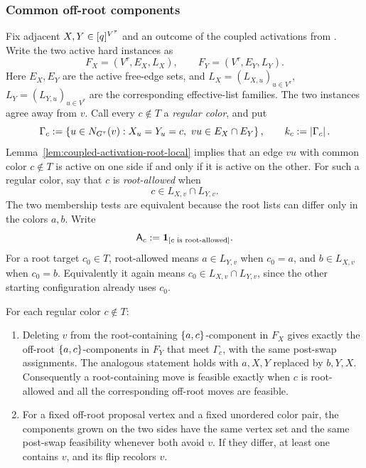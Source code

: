 \subsubsection{Common off-root components}
Fix adjacent \(X,Y\in[q]^{V^\tau}\) and an outcome of the coupled activations from
.  Write the two active hard
instances as
\[
  F_X=(V^\tau,E_X,L_X),\qquad F_Y=(V^\tau,E_Y,L_Y).
\]
Here \(E_X,E_Y\) are the active free-edge sets, and
\(L_X=(L_{X,u})_{u\in V^\tau}\), \(L_Y=(L_{Y,u})_{u\in V^\tau}\)
are the corresponding effective-list families.  The two instances agree
away from $v$.  Call every \(c\notin T\) a
\emph{regular color}, and put
\[
  \Gamma_c:=\left\{u\in N_{G^\tau}(v):
      X_u=Y_u=c,\ vu\in E_X\cap E_Y\right\},\qquad k_c:=\left|\Gamma_c\right|.
\]
Lemma~\ref{lem:coupled-activation-root-local} implies that an edge $vu$ with common color
$c\notin T$ is active on one side if and only if it is active on the other.
For such a regular color, say that \(c\) is \emph{root-allowed} when
\[
  c\in L_{X,v}\cap L_{Y,v}.
\]
The two membership tests are equivalent because the root lists can differ
only in the colors \(a,b\).  Write
\[
  \mathsf A_c:=\mathbf{1}_{\left[c\text{ is root-allowed}\right]}.
\]
For a root target \(c_0\in T\), root-allowed
means \(a\in L_{Y,v}\) when \(c_0=a\), and \(b\in L_{X,v}\) when \(c_0=b\).
Equivalently it again means \(c_0\in L_{X,v}\cap L_{Y,v}\), since the other
starting configuration already uses \(c_0\).

\begin{lemma}\label{lem:cv-root-local-structure}
For each regular color $c\notin T$:
\begin{enumerate}
\item Deleting $v$ from the root-containing $\left\{a,c\right\}$-component in
  $F_X$ gives exactly the off-root $\left\{a,c\right\}$-components in $F_Y$ that
  meet $\Gamma_c$, with the same post-swap assignments.  The analogous
  statement holds with $a,X,Y$ replaced by $b,Y,X$.  Consequently a
  root-containing move is feasible exactly when $c$ is root-allowed
  and all the corresponding off-root moves are feasible.
\item For a fixed off-root proposal vertex and a fixed unordered color
  pair, the components grown on the two sides have the same vertex set and
  the same post-swap feasibility whenever both avoid $v$.  If they differ,
  at least one contains $v$, and its flip recolors $v$.
\end{enumerate}
\end{lemma}

